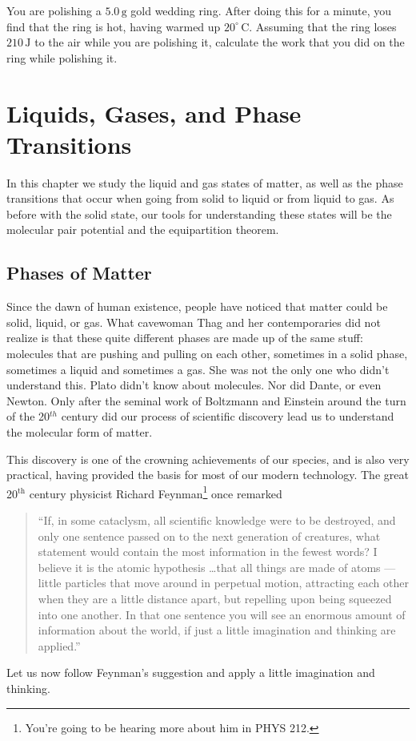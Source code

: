 \begin{exercise}
You are polishing a $5.0\,\text{g}$ gold wedding ring.  After doing
this for a minute, you find that the ring is hot, having warmed up
$20^{\circ}\,\text{C}$.  Assuming that the ring loses $210\,\text{J}$
to the air while you are polishing it, calculate the work that you did
on the ring while polishing it.
\label{prob:polish_ring}
\end{exercise}


\chapter{Liquids, Gases, and Phase Transitions}
\label{chap:liquids_and_gases}



In this chapter we study the liquid and gas states of matter, as
well as the phase transitions that occur when going from solid to
liquid or from liquid to gas.  As before with the solid state, our tools
for understanding these states will be the molecular pair potential
and the equipartition theorem.

\section{Phases of Matter}


Since the dawn of human existence, people have noticed that
matter could be solid, liquid, or gas.  What cavewoman Thag and her
contemporaries did not realize is that these quite different phases
are made up of the same stuff: molecules that are 
pushing and pulling on each other, sometimes in a solid phase, sometimes
a liquid and sometimes a gas.  
She was not the only one who didn't understand this.  Plato didn't
know about molecules.  Nor did Dante, or even Newton.  Only after the
seminal work of Boltzmann and Einstein around the turn of the 20$^{ th}$ 
century did our process of scientific discovery lead us to understand the
molecular form of matter.  

This discovery is one of the crowning achievements of our species, and
is also very practical, having provided the basis for most of our
modern technology.  The great 20$^\text{th}$ century physicist Richard
Feynman\footnote{You're going to be hearing more about him in PHYS
  212.} once remarked
\begin{quote}
  ``If, in some cataclysm, all scientific knowledge were to be
  destroyed, and only one sentence passed on to the next generation of
  creatures, what statement would contain the most information in the
  fewest words? I believe it is the atomic hypothesis \dots that all
  things are made of atoms --- little particles that move around in
  perpetual motion, attracting each other when they are a little
  distance apart, but repelling upon being squeezed into one
  another. In that one sentence you will see an enormous amount of
  information about the world, if just a little imagination and
  thinking are applied.''
\end{quote}
Let us now follow Feynman's suggestion and apply a little
imagination and thinking.

